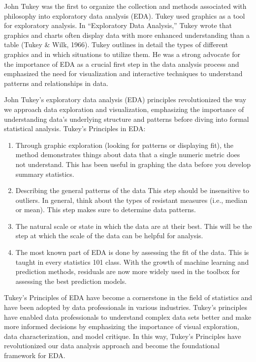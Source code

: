 \documentclass[print]{nuthesis}
\begin{document}
John Tukey was the first to organize the collection and methods associated with philosophy into exploratory data analysis (EDA).
Tukey used graphics as a tool for exploratory analysis.
In ``Exploratory Data Analysis,'' Tukey wrote that graphics and charts often display data with more enhanced understanding than a table (Tukey \& Wilk, 1966).
Tukey outlines in detail the types of different graphics and in which situations to utilize them.
He was a strong advocate for the importance of EDA as a crucial first step in the data analysis process and emphasized the need for visualization and interactive techniques to understand patterns and relationships in data.

John Tukey's exploratory data analysis (EDA) principles revolutionized the way we approach data exploration and visualization, emphasizing the importance of understanding data's underlying structure and patterns before diving into formal statistical analysis.
Tukey's Principles in EDA:

\begin{enumerate}
\def\labelenumi{\arabic{enumi}.}
\item
  Through graphic exploration (looking for patterns or displaying fit), the method demonstrates things about data that a single numeric metric does not understand.
  This has been useful in graphing the data before you develop summary statistics.
\item
  Describing the general patterns of the data This step should be insensitive to outliers.
  In general, think about the types of resistant measures (i.e., median or mean).
  This step makes sure to determine data patterns.
\item
  The natural scale or state in which the data are at their best.
  This will be the step at which the scale of the data can be helpful for analysis.
\item
  The most known part of EDA is done by assessing the fit of the data.
  This is taught in every statistics 101 class.
  With the growth of machine learning and prediction methods, residuals are now more widely used in the toolbox for assessing the best prediction models.
\end{enumerate}

Tukey's Principles of EDA have become a cornerstone in the field of statistics and have been adopted by data professionals in various industries.
Tukey's principles have enabled data professionals to understand complex data sets better and make more informed decisions by emphasizing the importance of visual exploration, data characterization, and model critique.
In this way, Tukey's Principles have revolutionized our data analysis approach and become the foundational framework for EDA.
\end{document}
